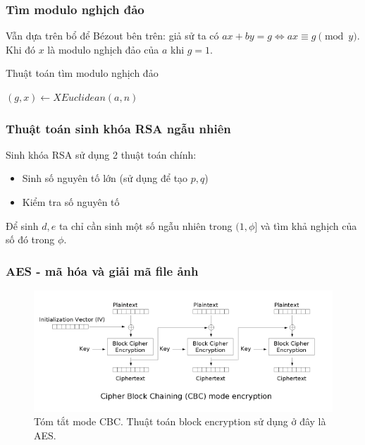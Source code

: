 \documentclass[12pt]{article}
\begin{document}
\subsubsection{Tìm modulo nghịch đảo}
Vẫn dựa trên bổ để Bézout bên trên: giả sử ta có $ax + by = g \iff ax \equiv g \pmod y$. Khi đó $x$ là modulo nghịch đảo của $a$ khi $g = 1$.

\begin{algorithm}
\caption{Thuật toán tìm modulo nghịch đảo}
\begin{algorithmic}
\State $(g, x) \gets XEuclidean(a, n)$

\Else 

\EndIf
\EndFunction
\end{algorithmic}
\end{algorithm}

\subsubsection{Thuật toán sinh khóa RSA ngẫu nhiên}
Sinh khóa RSA sử dụng 2 thuật toán chính:
\begin{itemize}
    \item Sinh số nguyên tố lớn (sử dụng để tạo $p, q$)
    \item Kiểm tra số nguyên tố
\end{itemize}
Để sinh $d, e$ ta chỉ cần sinh một số ngẫu nhiên trong $(1, \phi]$ và tìm khả nghịch của số đó trong $\phi$.

\subsubsection{AES - mã hóa và giải mã file ảnh}
\begin{figure}[H]
\centering
\includegraphics[]{Cbc_encryption.png}
\caption{Tóm tắt mode CBC.\cite{WikipediaEN:CBC} Thuật toán block encryption sử dụng ở đây là AES.}
\end{figure}
\end{document}
